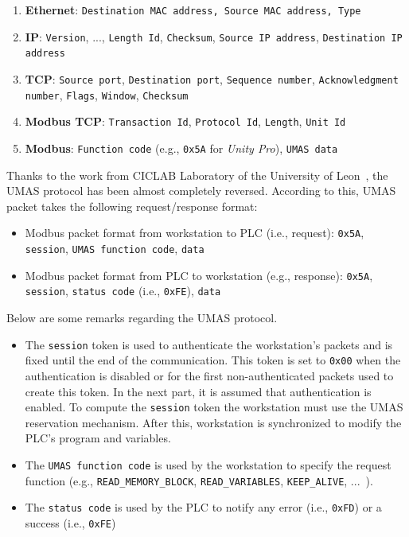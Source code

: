 \begin{enumerate}
    \item \textbf{Ethernet}: \texttt{Destination MAC address, Source MAC address, Type}
    \item \textbf{IP}: \texttt{Version}, ..., \texttt{Length Id}, \texttt{Checksum}, \texttt{Source IP address}, \texttt{Destination IP address}
    \item \textbf{TCP}: \texttt{Source port}, \texttt{Destination port}, \texttt{Sequence number}, \texttt{Acknowledgment number}, \texttt{Flags}, \texttt{Window}, \texttt{Checksum}
    \item \textbf{Modbus TCP}: \texttt{Transaction Id}, \texttt{Protocol Id}, \texttt{Length}, \texttt{Unit Id}
    \item \textbf{Modbus}: \texttt{Function code} (e.g., \texttt{0x5A} for \emph{Unity Pro}), \texttt{UMAS data}
\end{enumerate}

Thanks to the work from CICLAB Laboratory of the University of Leon~\cite{umas}, the UMAS protocol has been almost completely reversed. According to this, UMAS packet takes the following request/response format:
\begin{itemize}
    \item Modbus packet format from workstation to PLC (i.e., request): \texttt{0x5A}, \texttt{session}, \texttt{UMAS function code}, \texttt{data}
    \item Modbus packet format from PLC to workstation (e.g., response): \texttt{0x5A}, \texttt{session}, \texttt{status code} (i.e., \texttt{0xFE}), \texttt{data}
\end{itemize}

Below are some remarks regarding the UMAS protocol.

\begin{itemize}
    \item The \texttt{session} token is used to authenticate the workstation's packets and is fixed until the end of the communication. This token is set to \texttt{0x00} when the authentication is disabled or for the first non-authenticated packets used to create this token. In the next part, it is assumed that authentication is enabled. To compute the \texttt{session} token the workstation must use the UMAS reservation mechanism. After this, workstation is synchronized to modify the PLC’s program and variables.
    \item The \texttt{UMAS function code} is used by the workstation to specify the request function (e.g., \texttt{READ\_MEMORY\_BLOCK}, \texttt{READ\_VARIABLES}, \texttt{KEEP\_ALIVE}, ...~\cite{umas}).
    \item The \texttt{status code} is used by the PLC to notify any error (i.e., \texttt{0xFD}) or a success (i.e., \texttt{0xFE})
\end{itemize}

